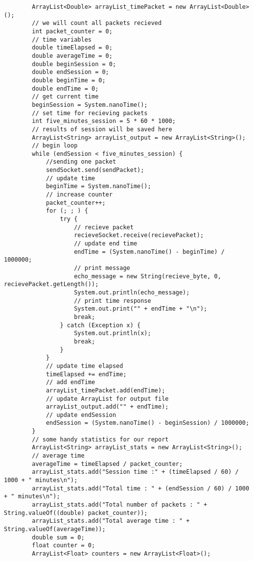 \documentclass{article}
\begin{document}
\begin{lstlisting}
        ArrayList<Double> arrayList_timePacket = new ArrayList<Double>();
        // we will count all packets recieved
        int packet_counter = 0;
        // time variables
        double timeElapsed = 0;
        double averageTime = 0;
        double beginSession = 0;
        double endSession = 0;
        double beginTime = 0;
        double endTime = 0;
        // get current time
        beginSession = System.nanoTime();
        // set time for recieving packets
        int five_minutes_session = 5 * 60 * 1000;
        // results of session will be saved here
        ArrayList<String> arrayList_output = new ArrayList<String>();
        // begin loop
        while (endSession < five_minutes_session) {
            //sending one packet
            sendSocket.send(sendPacket);
            // update time
            beginTime = System.nanoTime();
            // increase counter
            packet_counter++;
            for (; ; ) {
                try {
                    // recieve packet
                    recieveSocket.receive(recievePacket);
                    // update end time
                    endTime = (System.nanoTime() - beginTime) / 1000000;
                    // print message
                    echo_message = new String(recieve_byte, 0, recievePacket.getLength());
                    System.out.println(echo_message);
                    // print time response
                    System.out.print("" + endTime + "\n");
                    break;
                } catch (Exception x) {
                    System.out.println(x);
                    break;
                }
            }
            // update time elapsed
            timeElapsed += endTime;
            // add endTime
            arrayList_timePacket.add(endTime);
            // update ArrayList for output file
            arrayList_output.add("" + endTime);
            // update endSession
            endSession = (System.nanoTime() - beginSession) / 1000000;
        }
        // some handy statistics for our report
        ArrayList<String> arrayList_stats = new ArrayList<String>();
        // average time
        averageTime = timeElapsed / packet_counter;
        arrayList_stats.add("Session time :" + (timeElapsed / 60) / 1000 + " minutes\n");
        arrayList_stats.add("Total time : " + (endSession / 60) / 1000 + " minutes\n");
        arrayList_stats.add("Total number of packets : " + String.valueOf((double) packet_counter));
        arrayList_stats.add("Total average time : " + String.valueOf(averageTime));
        double sum = 0;
        float counter = 0;
        ArrayList<Float> counters = new ArrayList<Float>();

\end{lstlisting}
\end{document}
